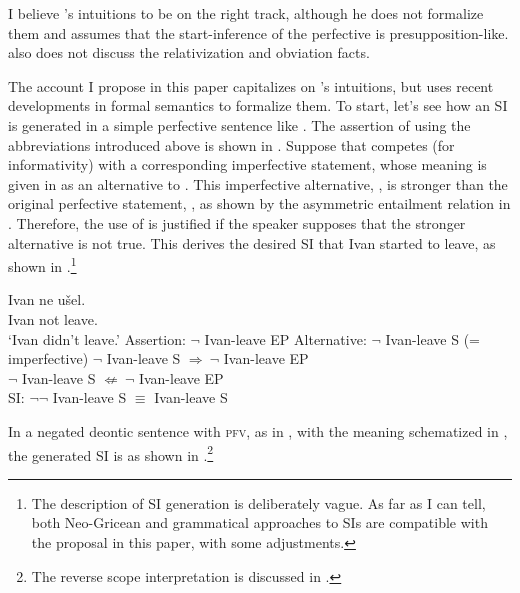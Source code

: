 \documentclass[output=paper,
modfonts,
newtxmath,colorlinks,citecolor=brown
]{langscibook}
\begin{document}
\noindent I believe \citeauthor{rap85}'s intuitions to be on the right track, although he does not formalize them and assumes that the start-inference of the perfective is presup\-position-like. \cite{rap85} also does not discuss the relativization and obviation facts. 

The account I propose in this paper capitalizes on \citeauthor{rap85}'s intuitions, but uses recent developments in formal semantics to formalize them. To start, let's see how an SI is generated in a simple perfective sentence like . The assertion of  using the abbreviations introduced above is shown in   . Suppose that  competes (for informativity) with a corresponding imperfective statement, whose meaning is given in  as an alternative to . This imperfective alternative, , is stronger than the original perfective statement, , as shown by the asymmetric entailment relation in . Therefore, the use of  is justified if the speaker supposes that the stronger alternative is not true. This derives the desired SI that Ivan started to leave, as shown in .\footnote{The description of SI generation is deliberately vague. As far as I can tell, both Neo-Gricean and grammatical approaches to SIs are compatible with the proposal in this paper, with some adjustments.   
}

\ea \ea \gll Ivan ne u\v sel. \\
	Ivan not {leave.\p} \\
    \glt `Ivan didn't leave.' \label{simplepfv}
    \ex Assertion: $\neg$ Ivan-leave EP \label{assertpfv}
    \ex Alternative: $\neg$ Ivan-leave S \hfill (= imperfective) \label{altpfv}
    \ex {}  $\neg$ Ivan-leave S $\Rightarrow\ \neg$ Ivan-leave EP \\
    {} $\neg$ Ivan-leave S $\not\Leftarrow\ \neg$ Ivan-leave EP  \label{ent} \\
    \ex SI: $\neg \neg$ Ivan-leave S $\equiv$ Ivan-leave S \label{derivesipfv}
    \z \z
 
 \noindent In a negated deontic sentence with \textsc{pfv}, as in , with the meaning schematized in , the generated SI is as shown in .\footnote{The reverse scope interpretation is discussed in .
 } 
 
 
\ea {}
	\z \z
\end{document}
